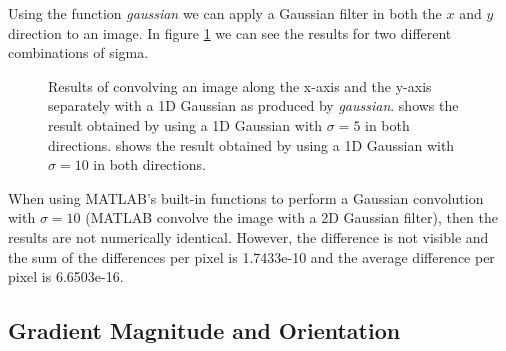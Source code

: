 \documentclass[a4paper]{article}
\begin{document}
\noindent
Using the function \emph{gaussian} we can apply a Gaussian filter in both the $x$ and $y$ direction to an image. In figure \ref{fig:blurredZebra} we can see the results for two different combinations of sigma.
\begin{figure}[H]
  \centering
  \caption{Results of convolving an image along the x-axis and the y-axis separately with a 1D Gaussian as produced by \emph{gaussian}.  shows the result obtained by using a 1D Gaussian with $\sigma = 5$ in both directions.  shows the result obtained by using a 1D Gaussian with $\sigma = 10$ in both directions. }
  \label{fig:blurredZebra}
\end{figure}

When using MATLAB's built-in functions to perform a Gaussian convolution with $\sigma = 10$ (MATLAB convolve the image with a 2D Gaussian filter), then the results are not numerically identical. However, the difference is not visible and the sum of the differences per pixel is 1.7433e-10 and the average difference per pixel is 6.6503e-16.\\

\subsection{Gradient Magnitude and Orientation}
\end{document}
